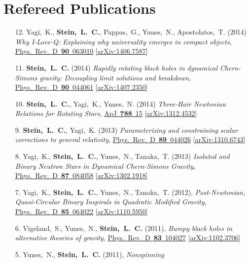 \section{\sc Refereed Publications}
\begin{enumerate}
\item[{12.}] Yagi,~K., {\bf Stein,~L.~C.}, Pappas,~G., Yunes,~N., Apostolatos,~T. (2014)
  {\it Why I-Love-Q: Explaining why universality emerges in compact objects},
  \href{http://dx.doi.org/10.1103/PhysRevD.90.063010}{Phys.~Rev.~D~{\bf 90}~063010}
  [\href{http://arxiv.org/abs/1406.7587}{arXiv:1406.7587}]
\item[{11.}] {\bf Stein,~L.~C.} (2014)
  {\it Rapidly rotating black holes in dynamical Chern-Simons gravity:
    Decoupling limit solutions and breakdown},
  \href{http://dx.doi.org/10.1103/PhysRevD.90.044061}{Phys.~Rev.~D~{\bf 90}~044061}
  [\href{http://arxiv.org/abs/1407.2350}{arXiv:1407.2350}]
\item[{10.}] {\bf Stein,~L.~C.}, Yagi,~K., Yunes,~N. (2014)
  {\it Three-Hair Newtonian Relations for Rotating Stars},
  \href{http://dx.doi.org/10.1088/0004-637X/788/1/15}{ApJ~{\bf 788}~15}
  [\href{http://arxiv.org/abs/1312.4532}{arXiv:1312.4532}]
\item[{9.}] {\bf Stein,~L.~C.}, Yagi,~K. (2013)
  {\it Parameterizing and constraining scalar corrections to general relativity},
  \href{http://dx.doi.org/10.1103/PhysRevD.89.044026}{Phys.~Rev.~D~{\bf 89}~044026}
  [\href{http://arxiv.org/abs/1310.6743}{arXiv:1310.6743}]
\item[{8.}] Yagi,~K., {\bf Stein,~L.~C.}, Yunes,~N., Tanaka,~T. (2013)
  {\it Isolated and Binary Neutron Stars in Dynamical Chern-Simons
    Gravity},
  \href{http://dx.doi.org/10.1103/PhysRevD.87.084058}{Phys.~Rev.~D~{\bf 87}~084058}
  [\href{http://arxiv.org/abs/1302.1918}{arXiv:1302.1918}]
\item[{7.}] Yagi,~K., {\bf Stein,~L.~C.}, Yunes,~N.,
  Tanaka,~T. (2012), {\it Post-Newtonian, Quasi-Circular Binary
    Inspirals in Quadratic Modified Gravity},
  \href{http://dx.doi.org/10.1103/PhysRevD.85.064022}{Phys.~Rev.~D~{\bf 85}~064022}
  [\href{http://arxiv.org/abs/1110.5950}{arXiv:1110.5950}]
\item[{6.}] Vigeland,~S., Yunes,~N., {\bf Stein,~L.~C.} (2011), {\it
    Bumpy black holes in alternative theories of gravity},
  \href{http://dx.doi.org/10.1103/PhysRevD.83.104027}{Phys.~Rev.~D~{\bf 83}~104027}
  [\href{http://arxiv.org/abs/1102.3706}{arXiv:1102.3706}]
\item[{5.}] Yunes,~N., {\bf Stein,~L.~C.} (2011), {\it Nonspinning
}
\end{enumerate}
